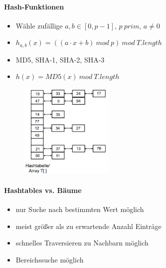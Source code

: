 \documentclass[
    ngerman,
    color=3b,
    load_common, %
    summary,
    boxarc,
]{tuda_summary}
\begin{document}
\paragraph{Hash-Funktionen}
\begin{description}[itemsep=1em,leftmargin=6cm]
    \item [Universelle Hash-Funktion]
          \begin{itemize}
              \item Wähle zufällige $a,b \in [0, p - 1]$, $p~prim$, $a \neq 0$
              \item $h_{a,b}(x)= ((a \cdot x + b)~mod~p)~mod~T.length$
          \end{itemize}
    \item [Krypthographische Hash-Funktionen]%
          \begin{itemize}%
              \item MD5, SHA-1, SHA-2, SHA-3
              \item $h(x) = MD5(x)~mod~T.length$
          \end{itemize}
\end{description}
\begin{figure}
    \includegraphics[width=0.4\textwidth]{pictures/hashtableLinkedList.PNG}
\end{figure}
\paragraph{Hashtables vs. Bäume}
\begin{description}[itemsep=1em,leftmargin=2cm]
    \item [Hashtables]
          \begin{itemize}
              \item nur Suche nach bestimmten Wert möglich
              \item meist größer als zu erwartende Anzahl Einträge
          \end{itemize}
    \item [Bäume]
          \begin{itemize}
              \item schnelles Traversieren zu Nachbarn möglich
              \item Bereichssuche möglich
          \end{itemize}
\end{description}
\end{document}
